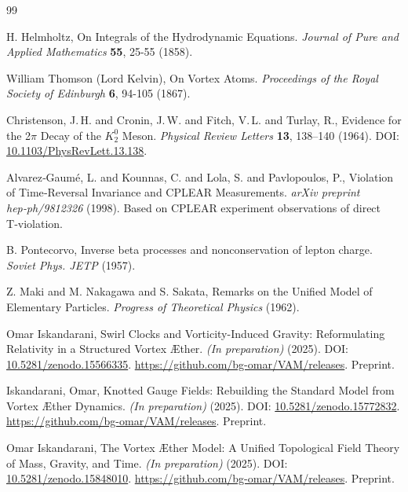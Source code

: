 \documentclass[preprint]{revtex4-2}
\begin{document}
\begin{thebibliography}{99}

H. Helmholtz,
\newblock On Integrals of the Hydrodynamic Equations.
\textit{Journal of Pure and Applied Mathematics} \textbf{55}, 25-55 (1858).


William Thomson (Lord Kelvin),
\newblock On Vortex Atoms.
\textit{Proceedings of the Royal Society of Edinburgh} \textbf{6}, 94-105 (1867).


Christenson, J.\,H. and Cronin, J.\,W. and Fitch, V.\,L. and Turlay, R.,
\newblock Evidence for the 2\(\pi\) Decay of the \(K_2^0\) Meson.
\textit{Physical Review Letters} \textbf{13}, 138--140 (1964).
\newblock DOI: \href{https://doi.org/10.1103/PhysRevLett.13.138}{10.1103/PhysRevLett.13.138}.


Alvarez‑Gaumé, L. and Kounnas, C. and Lola, S. and Pavlopoulos, P.,
\newblock Violation of Time‑Reversal Invariance and CPLEAR Measurements.
\textit{arXiv preprint hep‑ph/9812326} (1998).
\newblock Based on CPLEAR experiment observations of direct T‑violation.


B. Pontecorvo,
\newblock Inverse beta processes and nonconservation of lepton charge.
\textit{Soviet Phys. JETP} (1957).


Z. Maki and M. Nakagawa and S. Sakata,
\newblock Remarks on the Unified Model of Elementary Particles.
\textit{Progress of Theoretical Physics} (1962).


Omar Iskandarani,
\newblock Swirl Clocks and Vorticity-Induced Gravity: Reformulating Relativity in a Structured Vortex Æther.
\textit{(In preparation)} (2025).
\newblock DOI: \href{https://doi.org/10.5281/zenodo.15566335}{10.5281/zenodo.15566335}.
\newblock \url{https://github.com/bg-omar/VAM/releases}.
\newblock Preprint.


Iskandarani, Omar,
\newblock Knotted Gauge Fields: Rebuilding the Standard Model from Vortex Æther Dynamics.
\textit{(In preparation)} (2025).
\newblock DOI: \href{https://doi.org/10.5281/zenodo.15772832}{10.5281/zenodo.15772832}.
\newblock \url{https://github.com/bg-omar/VAM/releases}.
\newblock Preprint.


Omar Iskandarani,
\newblock The Vortex Æther Model: A Unified Topological Field Theory of Mass, Gravity, and Time.
\textit{(In preparation)} (2025).
\newblock DOI: \href{https://doi.org/10.5281/zenodo.15848010}{10.5281/zenodo.15848010}.
\newblock \url{https://github.com/bg-omar/VAM/releases}.
\newblock Preprint.



\end{thebibliography}
\end{document}
